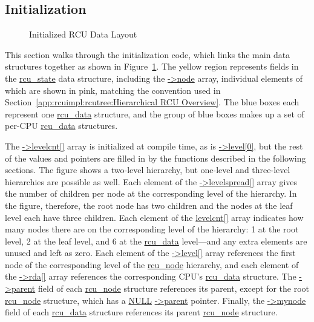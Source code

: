 \subsection{Initialization}
\label{app:rcuimpl:rcutreewt:Initialization}

\begin{figure}[tb]
\begin{center}
\end{center}
\caption{Initialized RCU Data Layout}
\label{fig:app:rcuimpl:rcutree:Initialized RCU Data Layout}
\end{figure}

This section walks through the initialization code, which links the
main data structures together as shown in
Figure~\ref{fig:app:rcuimpl:rcutree:Initialized RCU Data Layout}.
The yellow region represents fields in the \url{rcu_state} data
structure, including the \url{->node} array, individual elements
of which are shown in pink, matching the convention used in
Section~\ref{app:rcuimpl:rcutree:Hierarchical RCU Overview}.
The blue boxes each represent one \url{rcu_data} structure,
and the group of blue boxes makes up a set of per-CPU \url{rcu_data}
structures.

The \url{->levelcnt[]} array is initialized at compile time, as is
\url{->level[0]}, but the rest of the values and pointers are filled
in by the functions described in the following sections.
The figure shows a two-level hierarchy, but one-level and three-level
hierarchies are possible as well.
Each element of the \url{->levelspread[]} array gives the number of
children per node at the corresponding level of the hierarchy.
In the figure, therefore, the root node has two children and the
nodes at the leaf level each have three children.
Each element of the \url{levelcnt[]} array indicates how many nodes
there are on the corresponding level of the hierarchy: 1 at the root
level, 2 at the leaf level, and 6 at the \url{rcu_data} level---and any
extra elements are unused and left as zero.
Each element of the \url{->level[]} array references the first
node of the corresponding level of the \url{rcu_node} hierarchy,
and each element of the \url{->rda[]} array references the corresponding
CPU's \url{rcu_data} structure.
The \url{->parent} field of each \url{rcu_node} structure references
its parent, except for the root \url{rcu_node} structure, which
has a \url{NULL} \url{->parent} pointer.
Finally, the \url{->mynode} field of each \url{rcu_data} structure
references its parent \url{rcu_node} structure.

